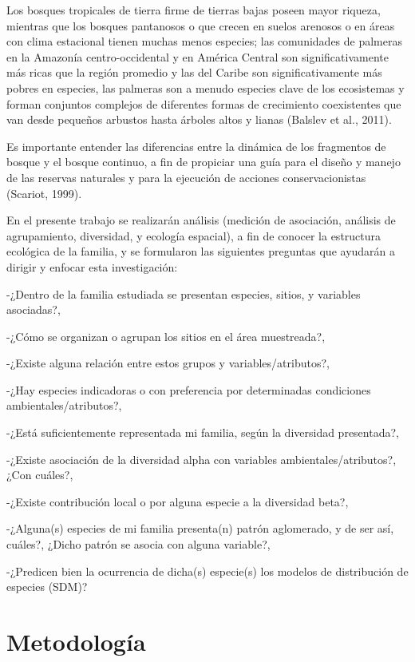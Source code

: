 \documentclass[11pt,]{article}
\begin{document}
Los bosques tropicales de tierra firme de tierras bajas poseen mayor
riqueza, mientras que los bosques pantanosos o que crecen en suelos
arenosos o en áreas con clima estacional tienen muchas menos especies;
las comunidades de palmeras en la Amazonía centro-occidental y en
América Central son significativamente más ricas que la región promedio
y las del Caribe son significativamente más pobres en especies, las
palmeras son a menudo especies clave de los ecosistemas y forman
conjuntos complejos de diferentes formas de crecimiento coexistentes que
van desde pequeños arbustos hasta árboles altos y lianas (Balslev et
al., 2011).

Es importante entender las diferencias entre la dinámica de los
fragmentos de bosque y el bosque continuo, a fin de propiciar una guía
para el diseño y manejo de las reservas naturales y para la ejecución de
acciones conservacionistas (Scariot, 1999).

En el presente trabajo se realizarán análisis (medición de asociación,
análisis de agrupamiento, diversidad, y ecología espacial), a fin de
conocer la estructura ecológica de la familia, y se formularon las
siguientes preguntas que ayudarán a dirigir y enfocar esta
investigación:

-¿Dentro de la familia estudiada se presentan especies, sitios, y
variables asociadas?,

-¿Cómo se organizan o agrupan los sitios en el área muestreada?,

-¿Existe alguna relación entre estos grupos y variables/atributos?,

-¿Hay especies indicadoras o con preferencia por determinadas
condiciones ambientales/atributos?,

-¿Está suficientemente representada mi familia, según la diversidad
presentada?,

-¿Existe asociación de la diversidad alpha con variables
ambientales/atributos?, ¿Con cuáles?,

-¿Existe contribución local o por alguna especie a la diversidad beta?,

-¿Alguna(s) especies de mi familia presenta(n) patrón aglomerado, y de
ser así, cuáles?, ¿Dicho patrón se asocia con alguna variable?,

-¿Predicen bien la ocurrencia de dicha(s) especie(s) los modelos de
distribución de especies (SDM)?

\section{Metodología}\label{metodologuxeda}
\end{document}
